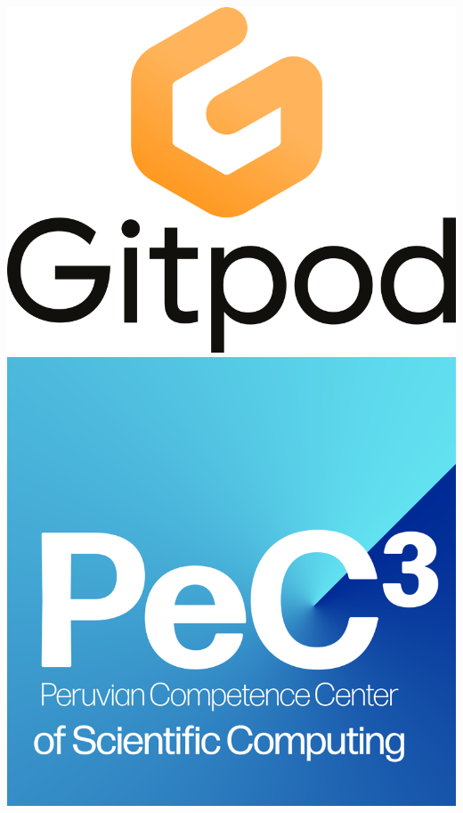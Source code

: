 \documentclass[
	paper=a0,
	style=ruled, %
	]{bfhsciposter}
\begin{document}
{	\includegraphics[height=\height]{gitpod}\quad
	\includegraphics[height=\height]{pec3logo}\quad
}
\end{document}
